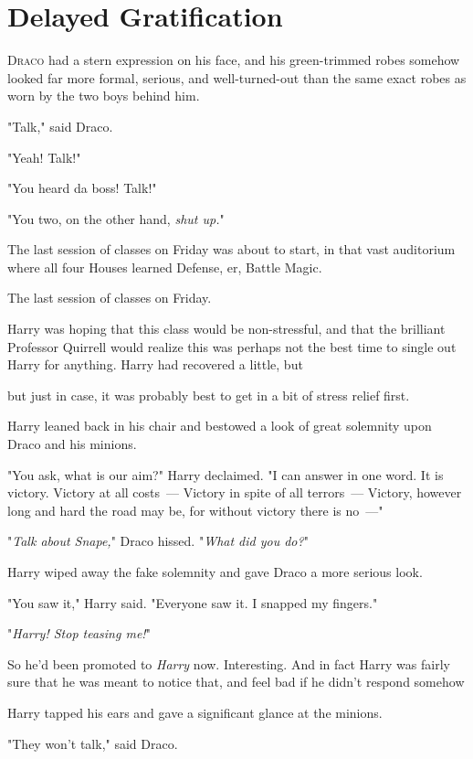 \chapter{Delayed Gratification}

\lettrine{D}{raco} had a stern expression on his face, and his green-trimmed robes somehow
looked far more formal, serious, and well-turned-out than the same exact robes
as worn by the two boys behind him.

"Talk," said Draco.

"Yeah! Talk!"

"You heard da boss! Talk!"

"You two, on the other hand, \emph{shut up.}"

The last session of classes on Friday was about to start, in that vast
auditorium where all four Houses learned Defense, er, Battle Magic.

The last session of classes on Friday.

Harry was hoping that this class would be non-stressful, and that the brilliant
Professor Quirrell would realize this was perhaps not the best time to single
out Harry for anything. Harry had recovered a little, but{\el}

{\el} but just in case, it was probably best to get in a bit of stress relief
first.

Harry leaned back in his chair and bestowed a look of great solemnity upon
Draco and his minions.

"You ask, what is our aim?" Harry declaimed. "I can answer in one word. It is
victory. Victory at all costs~--- Victory in spite of all terrors~--- Victory,
however long and hard the road may be, for without victory there is no~---"

"\emph{Talk about Snape,}" Draco hissed. "\emph{What did you do?}"

Harry wiped away the fake solemnity and gave Draco a more serious look.

"You saw it," Harry said. "Everyone saw it. I snapped my fingers."

"\emph{Harry! Stop teasing me!}"

So he'd been promoted to \emph{Harry} now. Interesting. And in fact Harry was
fairly sure that he was meant to notice that, and feel bad if he didn't respond
somehow{\el}

Harry tapped his ears and gave a significant glance at the minions.

"They won't talk," said Draco.

